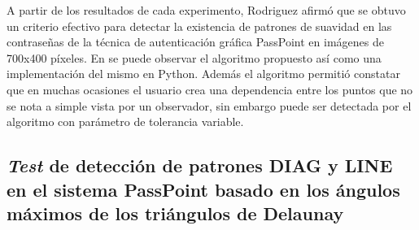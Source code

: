 \documentclass[12pt]{report}
\begin{document}
A partir de los resultados de cada experimento, Rodriguez afirmó que se obtuvo un criterio efectivo para detectar la existencia de patrones de suavidad en las contraseñas de la técnica de autenticación gráfica PassPoint en imágenes de 700x400 píxeles. En \cite{3} se puede observar el algoritmo propuesto así como una implementación del mismo en Python. Además el algoritmo permitió constatar que en muchas ocasiones el usuario crea una dependencia entre los puntos que no se nota a simple vista por un observador, sin embargo puede ser detectada por el algoritmo con parámetro de tolerancia variable.


\subsection{\textit{Test} de detección de patrones DIAG y LINE en el sistema PassPoint basado en los ángulos máximos de los triángulos de Delaunay  }

\label{sec:1.4.2}


\end{document}
